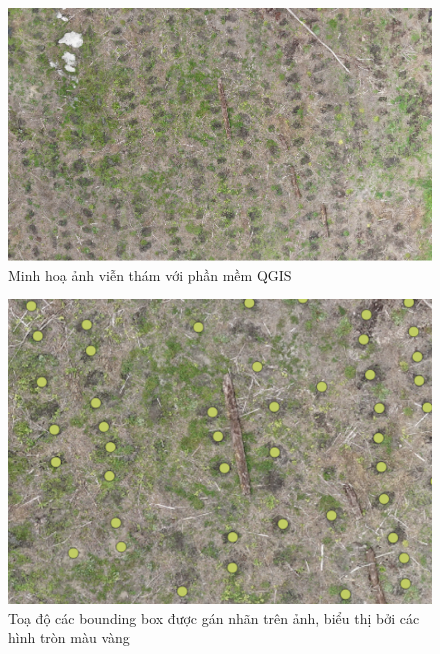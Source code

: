 \documentclass[a4paper, 12pt]{report}
\begin{document}
\begin{enumerate}[label= \textit{\alph*)}]
\newpage
 \begin{figure}[!htb]
	\centering
	\includegraphics[width=1\linewidth]{Images/qgisa}
	\caption{Minh hoạ ảnh viễn thám với phần mềm QGIS} 
	\label{fig:1a}
\end{figure}


 \begin{figure}[!htb]
	\centering
	\includegraphics[width=0.7\linewidth]{Images/qgisb}
	\caption{Toạ độ các bounding box được gán nhãn trên ảnh,  biểu thị bởi các hình tròn màu vàng}
	\label{fig:1b}
\end{figure}




\end{enumerate}
\end{document}
